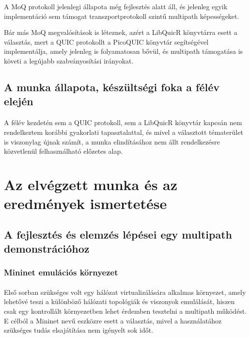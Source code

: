 \documentclass[a4paper,oneside]{article}
\begin{document}
A MoQ protokoll jelenlegi állapota még fejlesztés alatt áll, és jelenleg egyik implementáció
sem támogat transzportprotokoll szintű multipath képességeket.

Bár más MoQ megvalósítások is léteznek, azért a LibQuicR könyvtárra esett a
választás, mert a QUIC protokollt a PicoQUIC könyvtár segítségével implementálja, amely
jelenleg is folyamatosan bővül, és multipath támogatása is követi a legújabb szabványosítási irányokat.

\subsection{A munka állapota, készültségi foka a félév elején}
\label{sec:munka-allap-kesz}
\paragraph{}
A félév kezdetén sem a QUIC protokoll, sem a LibQuicR könyvtár kapcsán nem 
rendelkeztem korábbi gyakorlati tapasztalattal, és mivel a választott 
tématerület is viszonylag újnak számít, a munka elindításához nem állt 
rendelkezésre közvetlenül felhasználható előzetes alap.

\newpage
\section{Az elvégzett munka és az eredmények ismertetése}
\label{sec:az-elvegzett-munka}


\subsection{A fejlesztés és elemzés lépései egy multipath demonstrációhoz}
\label{sec:a-munkam-ismert}

\subsubsection{Mininet emulációs környezet}

 \paragraph{}

 Első sorban szükséges volt egy hálózat virtualizálására alkalmas környezet,
amely lehetővé teszi a különböző hálózati topológiák és viszonyok emulálását, 
hiszen csak egy kontrollált környezetben 
lehet érdemben tesztelni a multipath működést. 
E célból a Mininet nevű eszközre esett a választás, mivel a használatához szükséges 
tudás elsajátítása nem igényelt sok időt.
\end{document}
